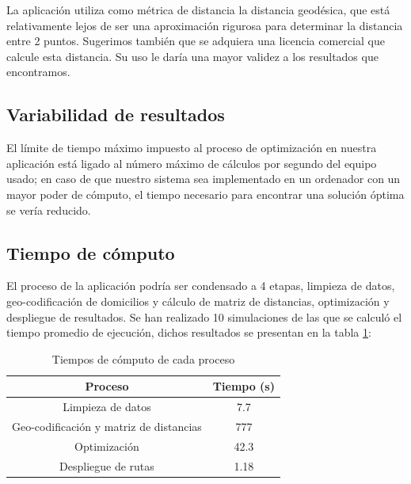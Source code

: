\documentclass[journal]{IEEEtran}
\begin{document}
            La aplicación utiliza como métrica de distancia la distancia geodésica, que está relativamente lejos de ser una aproximación rigurosa para determinar la distancia entre 2 puntos. Sugerimos también que se adquiera una licencia comercial que calcule esta distancia. Su uso le daría una mayor validez a los resultados que encontramos.
        
        \subsection{Variabilidad de resultados}

            El límite de tiempo máximo impuesto al proceso de optimización en nuestra aplicación está ligado al número máximo de cálculos por segundo del equipo usado; en caso de que nuestro sistema sea implementado en un ordenador con un mayor poder de cómputo, el tiempo necesario para encontrar una solución óptima se vería reducido.

        \subsection{Tiempo de cómputo}

            El proceso de la aplicación podría ser condensado a 4 etapas, limpieza de datos, geo-codificación de domicilios y cálculo de matriz de distancias, optimización y despliegue de resultados. Se han realizado 10 simulaciones de las que se calculó el tiempo promedio de ejecución, dichos resultados se presentan en la tabla \ref{table:execution-times}:

            \begin{table}[h!]
                \centering
                \begin{tabular}{ ||c|c|| }
                    \hline
                    Proceso & Tiempo (s) \\
                    \hline
                    Limpieza de datos & 7.7 \\
                    \hline
                    Geo-codificación y matriz de distancias & 777 \\
                    \hline
                    Optimización & 42.3 \\
                    \hline
                    Despliegue de rutas & 1.18 \\
                    \hline
                \end{tabular}
                \caption{Tiempos de cómputo de cada proceso}
                \label{table:execution-times}
            \end{table}
\end{document}
